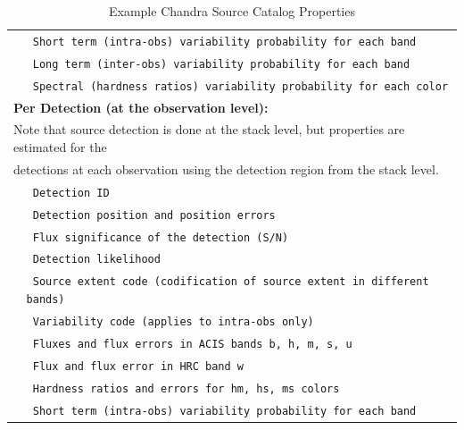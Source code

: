\documentclass[11pt,a4paper]{ivoa}
\begin{document}
\begin{table}[ht!]
\begin{tabular}{|p{0.4cm}p{10.0cm}|}
    & \texttt{ Short term (intra-obs) variability probability for each band } \\
    & \texttt{ Long term (inter-obs) variability probability for each band } \\
    & \texttt{ Spectral (hardness ratios) variability probability for each color } \\
    \hline
    \multicolumn{2}{|l|}{\textbf{Per Detection (at the observation level):}} \\
    \multicolumn{2}{|l|}{ Note that source detection is done at the stack level, but properties are estimated for the } \\
    \multicolumn{2}{|l|}{detections at each observation using the detection region from the stack level.} \\
    & \texttt{ Detection ID } \\
    & \texttt{ Detection position and position errors } \\
    & \texttt{ Flux significance of the detection (S/N) } \\
    & \texttt{ Detection likelihood } \\
    & \texttt{ Source extent code (codification of source extent in different bands) } \\
    & \texttt{ Variability code (applies to intra-obs only) } \\
    & \texttt{ Fluxes and flux errors in ACIS bands b, h, m, s, u } \\
    & \texttt{ Flux and flux error in  HRC band w } \\
    & \texttt{ Hardness ratios and errors for hm, hs, ms colors } \\
    & \texttt{ Short term (intra-obs) variability probability for each band } \\
    \hline

  \end{tabular}
  \caption{ Example Chandra Source Catalog Properties }
  \label{tab:chandra_properties}
 \end{table}
\end{document}
